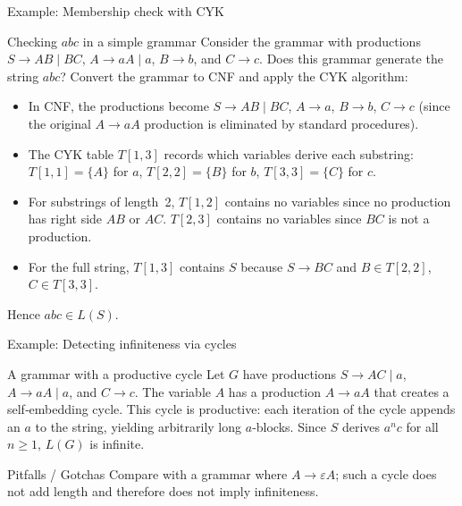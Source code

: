 \begin{frame}[t]{Example: Membership check with CYK}
  \begin{texample}{Checking $a b c$ in a simple grammar}
    Consider the grammar with productions $S \rightarrow AB \mid BC$, $A
    \rightarrow aA \mid a$, $B \rightarrow b$, and $C \rightarrow c$.  Does
    this grammar generate the string $abc$?  Convert the grammar to
    CNF and apply the CYK algorithm:
    \begin{itemize}
      \item In CNF, the productions become $S \rightarrow AB \mid BC$, $A
        \rightarrow a$, $B \rightarrow b$, $C \rightarrow c$ (since the
        original $A \rightarrow aA$ production is eliminated by standard
        procedures).
      \item The CYK table $T[1,3]$ records which variables derive each
        substring: $T[1,1]=\{A\}$ for $a$, $T[2,2]=\{B\}$ for $b$,
        $T[3,3]=\{C\}$ for $c$.
      \item For substrings of length 2, $T[1,2]$ contains no
        variables since no production has right side $A B$ or $A C$.
        $T[2,3]$ contains no variables since $B C$ is not a production.
      \item For the full string, $T[1,3]$ contains $S$ because
        $S \rightarrow B C$ and $B \in T[2,2]$, $C \in T[3,3]$.
    \end{itemize}
    Hence $abc \in L(S)$.
  \end{texample}
  \label{fr:6.3-12}
\end{frame}

\begin{frame}[t]{Example: Detecting infiniteness via cycles}
  \begin{texample}{A grammar with a productive cycle}
    Let $G$ have productions $S \rightarrow A C \mid a$, $A \rightarrow a A
    \mid a$, and $C \rightarrow c$.  The variable $A$ has a production
    $A \rightarrow aA$ that creates a self‑embedding cycle.  This cycle
    is productive: each iteration of the cycle appends an $a$ to the
    string, yielding arbitrarily long $a$‑blocks.  Since $S$ derives
    $a^n c$ for all $n \ge 1$, $L(G)$ is infinite.
  \end{texample}
  \begin{talert}{Pitfalls / Gotchas}
    Compare with a grammar where $A \rightarrow \varepsilon A$; such a
    cycle does not add length and therefore does not imply infiniteness.
  \end{talert}
  \label{fr:6.3-13}
\end{frame}

